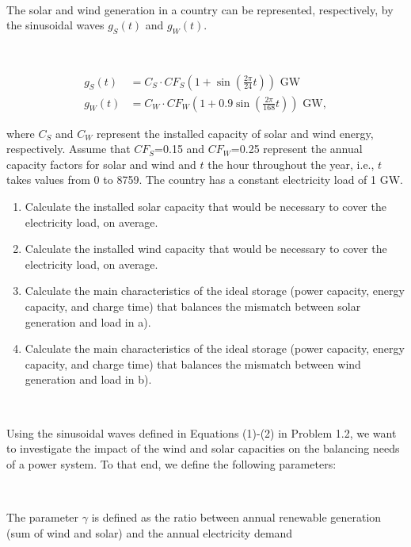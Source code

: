 \documentclass[10pt]{article}
\newenvironment{problem}[2][Problem]{\begin{trivlist}
\item[\hskip \labelsep {\bfseries #1}\hskip \labelsep {\bfseries #2.}]}{\end{trivlist}}
\begin{document}
\

\begin{problem}{1.2}
The solar and wind generation in a country can be represented, respectively, by the sinusoidal waves $g_S(t)$ and $g_W(t)$. 

\

\begin{align}
	g_S(t)&=C_S \cdot  CF_S (1+\sin({\frac{2\pi}{24} t})) \text{ GW} \\
	g_W (t)&=C_W  \cdot CF_W (1+0.9\sin({\frac{2\pi}{168} t})) \text{ GW},
\end{align}

where $C_S$ and $C_W$ represent the installed capacity of solar and wind energy, respectively. Assume that $CF_S$=0.15 and $CF_W$=0.25 represent the annual capacity factors for solar and wind and $t$ the hour throughout the year, i.e., $t$ takes values from 0 to 8759. The country has a constant electricity load of 1 GW.

\begin{enumerate}
\item[a)] Calculate the installed solar capacity that would be necessary to cover the electricity load, on average.  
\item[b)] Calculate the installed wind capacity that would be necessary to cover the electricity load, on average.  
\item[c)] Calculate the main characteristics of the ideal storage (power capacity, energy capacity, and charge time) that balances the mismatch between solar generation and load in a).
\item[d)] Calculate the main characteristics of the ideal storage (power capacity, energy capacity, and charge time) that balances the mismatch between wind generation and load in b).

\end{enumerate}

\end{problem}

\

\begin{problem}{1.3}

\end{problem}
Using the sinusoidal waves defined in Equations (1)-(2) in Problem 1.2, we want to investigate the impact of the wind and solar capacities on the balancing needs of a power system. To that end, we define the following parameters:

\

The parameter $\gamma$ is defined as the ratio between annual renewable generation (sum of wind and solar) and the annual electricity demand 
\end{document}
